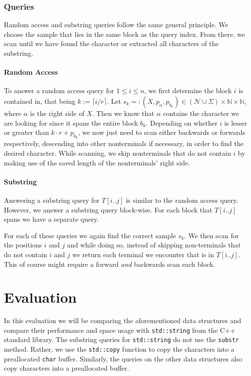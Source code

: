 \documentclass{scrartcl}
\begin{document}
\subsubsection{Queries}

Random access and substring queries follow the same general principle.
We choose the sample that lies in the same block as the query index.
From there, we scan until we have found the character or extracted all characters of the substring.

\paragraph{Random Access}

To answer a random access query for $1 \leq i \leq n$, we first determine the block $i$ is contained in, that being $k := \lceil i/r \rceil$.
Let $s_k =: (X, p_{\alpha}, p_{b_k}) \in (\mathcal{N} \cup \Sigma) \times \mathbb{N} \times \mathbb{N}$, where $\alpha$ is the right side of $X$.
Then we know that $\alpha$ contains the character we are looking for since it spans the entire block $b_k$.
Depending on whether $i$ is lesser or greater than $k \cdot r + p_{b_k}$, we now just need to scan either backwards or forwards respectively,
descending into other nonterminals if necessary, in order to find the desired character.
While scanning, we skip nonterminals that do not contain $i$ by making use of the saved length of the nonterminals' right side.

\paragraph{Substring}

Answering a substring query for $T[i..j]$ is similar to the random access query.
However, we answer a substring query block-wise. For each block that $T[i..j]$ spans we have a separate query.

For each of these queries we again find the correct sample $s_k$.
We then scan for the positions $i$ and $j$ and while doing so, instead of skipping non-terminals that do not contain $i$ and $j$
we return each terminal we encounter that is in $T[i..j]$.
This of course might require a forward \emph{and} backwards scan each block.

\section{Evaluation}

In this evaluation we will be comparing the aforementioned data structures and compare their performance and space usage with \texttt{std::string} from the C++ standard library.
The substring queries for \texttt{std::string} do not use the \texttt{substr} method.
Rather, we use the \texttt{std::copy} function to copy the characters into a preallocated \texttt{char} buffer.
Similarly, the queries on the other data structures also copy characters into a preallocated buffer.
\end{document}
